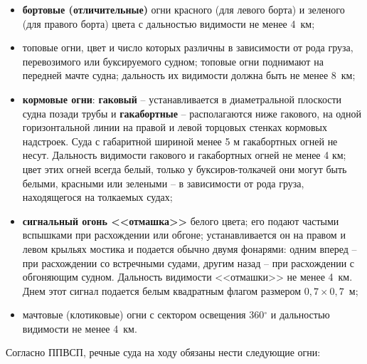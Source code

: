 \documentclass[a4paper, 12pt, twoside, final]{scrbook}
\begin{document}
\begin{itemize}
\item \textbf{бортовые (отличительные)} огни красного (для левого борта) и зеленого (для правого борта) цвета с дальностью видимости не менее 4~км;
\item топовые огни, цвет и число которых различны в зависимости от рода груза, перевозимого или буксируемого судном; топовые огни поднимают на передней мачте судна; дальность их видимости должна быть не менее 8~км;
\item \textbf{кормовые огни}: \textbf{гаковый} \--- устанавливается в диаметральной плоскости судна позади трубы и \textbf{гакабортные} \--- располагаются ниже гакового, на одной горизонтальной линии на правой и левой торцовых стенках кормовых надстроек. Суда с габаритной шириной менее 5 м гакабортных огней не несут. Дальность видимости гакового и гакабортных огней не менее 4 км; цвет этих огней всегда белый, только у буксиров-толкачей они могут быть белыми, красными или зелеными \--- в зависимости от рода груза, находящегося на толкаемых судах; 
\item \textbf{сигнальный огонь <<отмашка>>} белого цвета; его подают частыми вспышками при расхождении или обгоне; устанавливается он на правом и левом крыльях мостика и подается обычно двумя фонарями: одним вперед \--- при расхождении со встречными судами, другим назад \--- при расхождении с обгоняющим судном. Дальность видимости <<отмашки>> не менее 4~км. Днем этот сигнал подается белым квадратным флагом размером $0{,}7\times0{,}7$~м;
\item мачтовые (клотиковые) огни с сектором освещения 360$^\circ$ и дальностью видимости не менее 4~км.
\end{itemize}

Согласно ППВСП, речные суда на ходу обязаны нести следующие огни:
\end{document}

